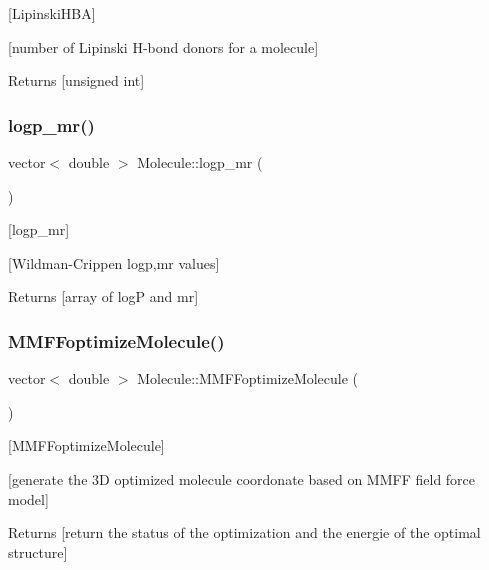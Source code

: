 \mbox{[}Lipinski\+H\+BA\mbox{]} 

\mbox{[}number of Lipinski H-\/bond donors for a molecule\mbox{]}

\begin{DoxyReturn}{Returns}
\mbox{[}unsigned int\mbox{]} 
\end{DoxyReturn}
\mbox{\label{class_molecule_ae3e5569d45cb96dbf1636d55e69273d4}} 
\subsubsection{\texorpdfstring{logp\+\_\+mr()}{logp\_mr()}}
{\footnotesize\ttfamily vector$<$ double $>$ Molecule\+::logp\+\_\+mr (\begin{DoxyParamCaption}{ }\end{DoxyParamCaption})}



\mbox{[}logp\+\_\+mr\mbox{]} 

\mbox{[}Wildman-\/\+Crippen logp,mr values\mbox{]} \begin{DoxyReturn}{Returns}
\mbox{[}array of logP and mr\mbox{]} 
\end{DoxyReturn}
\mbox{\label{class_molecule_a5e441ebbeef50a379ed79911805a5124}} 
\subsubsection{\texorpdfstring{M\+M\+F\+Foptimize\+Molecule()}{MMFFoptimizeMolecule()}\hspace{0.1cm}{\footnotesize\ttfamily [1/2]}}
{\footnotesize\ttfamily vector$<$ double $>$ Molecule\+::\+M\+M\+F\+Foptimize\+Molecule (\begin{DoxyParamCaption}{ }\end{DoxyParamCaption})}



\mbox{[}M\+M\+F\+Foptimize\+Molecule\mbox{]} 

\mbox{[}generate the 3D optimized molecule coordonate based on M\+M\+FF field force model\mbox{]}

\begin{DoxyReturn}{Returns}
\mbox{[}return the status of the optimization and the energie of the optimal structure\mbox{]} 
\end{DoxyReturn}
\mbox{\label{class_molecule_a871ec0fe06c07a873ef29d1af4190640}} 
